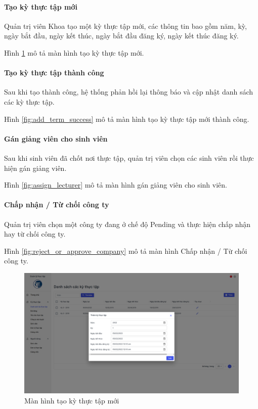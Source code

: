 \documentclass[./../main.tex]{subfiles}
\begin{document}
\paragraph*{Tạo kỳ thực tập mới}

Quản trị viên Khoa tạo một kỳ thực tập mới, các thông tin bao gồm năm, kỳ, ngày bắt đầu, ngày kết thúc, ngày bắt đầu đăng ký, ngày kết thúc đăng ký.

Hình \ref{fig:add_term_page} mô tả màn hình tạo kỳ thực tập mới.

\paragraph*{Tạo kỳ thực tập thành công}

Sau khi tạo thành công, hệ thống phản hồi lại thông báo và cập nhật danh sách các kỳ thực tập.

Hình \ref{fig:add_term_success} mô tả màn hình tạo kỳ thực tập mới thành công.

\paragraph*{Gán giảng viên cho sinh viên}

Sau khi sinh viên đã chốt nơi thực tập, quản trị viên chọn các sinh viên rồi thực hiện gán giảng viên.

Hình \ref{fig:assign_lecturer} mô tả màn hình gán giảng viên cho sinh viên.

\paragraph*{Chấp nhận / Từ chối công ty}

Quản trị viên chọn một công ty đang ở chế độ Pending và thực hiện chấp nhận hay từ chối công ty.

Hình \ref{fig:reject_or_approve_company} mô tả màn hình Chấp nhận / Từ chối công ty.

\begin{figure}[]
	\includegraphics[width=\linewidth]{./images/image19.png}
	\caption{Màn hình tạo kỳ thực tập mới}
	\label{fig:add_term_page}
\end{figure}
\end{document}

